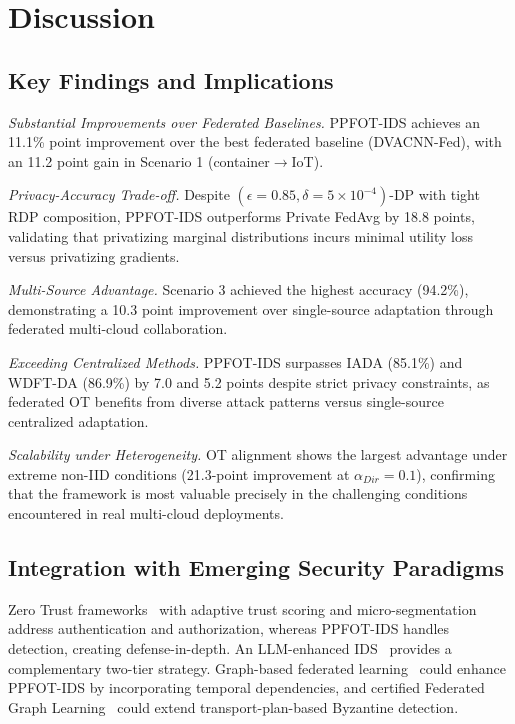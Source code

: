 \documentclass{ieeeaccess}
\theoremstyle{plain}
\theoremstyle{definition}
\theoremstyle{remark}
\begin{document}
\section{Discussion}
\label{sec:discussion}

\subsection{Key Findings and Implications}

\textit{Substantial Improvements over Federated Baselines.} PPFOT-IDS achieves an 11.1\% point improvement over the best federated baseline (DVACNN-Fed), with an 11.2 point gain in Scenario 1 (container$\to$IoT).

\textit{Privacy-Accuracy Trade-off.} Despite $(\epsilon = 0.85, \delta = 5 \times 10^{-4})$-DP with tight RDP composition, PPFOT-IDS outperforms Private FedAvg by 18.8 points, validating that privatizing marginal distributions incurs minimal utility loss versus privatizing gradients.

\textit{Multi-Source Advantage.} Scenario 3 achieved the highest accuracy (94.2\%), demonstrating a 10.3 point improvement over single-source adaptation through federated multi-cloud collaboration.

\textit{Exceeding Centralized Methods.} PPFOT-IDS surpasses IADA (85.1\%) and WDFT-DA (86.9\%) by 7.0 and 5.2 points despite strict privacy constraints, as federated OT benefits from diverse attack patterns versus single-source centralized adaptation.

\textit{Scalability under Heterogeneity.} OT alignment shows the largest advantage under extreme non-IID conditions (21.3-point improvement at $\alpha_{Dir} = 0.1$), confirming that the framework is most valuable precisely in the challenging conditions encountered in real multi-cloud deployments.

\subsection{Integration with Emerging Security Paradigms}

Zero Trust frameworks~\cite{adanigbo2024} with adaptive trust scoring and micro-segmentation address authentication and authorization, whereas PPFOT-IDS handles detection, creating defense-in-depth. An LLM-enhanced IDS~\cite{agrafiotis2024} provides a complementary two-tier strategy. Graph-based federated learning~\cite{wu2024} could enhance PPFOT-IDS by incorporating temporal dependencies, and certified Federated Graph Learning~\cite{yang2024} could extend transport-plan-based Byzantine detection.
\end{document}

